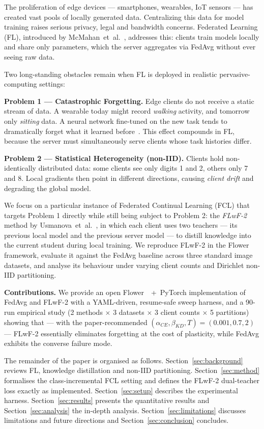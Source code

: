 \documentclass[journal]{IEEEtran}
\begin{document}
The proliferation of edge devices --- smartphones, wearables, IoT
sensors --- has created vast pools of locally generated data.
Centralizing this data for model training raises serious privacy,
legal and bandwidth concerns. Federated Learning (FL), introduced by
McMahan~et~al.~\cite{fedavg}, addresses this: clients train models
locally and share only parameters, which the server aggregates via
FedAvg without ever seeing raw data.

Two long-standing obstacles remain when FL is deployed in realistic
pervasive-computing settings:

\textbf{Problem 1 --- Catastrophic Forgetting.} Edge clients do not
receive a static stream of data. A wearable today might record
\textit{walking} activity, and tomorrow only \textit{sitting} data.
A neural network fine-tuned on the new task tends to dramatically
forget what it learned before~\cite{forgetting}. This effect compounds
in FL, because the server must simultaneously serve clients whose task
histories differ.

\textbf{Problem 2 --- Statistical Heterogeneity (non-IID).} Clients
hold non-identically distributed data: some clients see only digits
1 and 2, others only 7 and 8. Local gradients then point in different
directions, causing \textit{client drift} and degrading the global
model.

We focus on a particular instance of Federated Continual Learning
(FCL) that targets Problem 1 directly while still being subject to
Problem 2: the \emph{FLwF-2} method by Usmanova~et~al.~\cite{flwf},
in which each client uses two teachers --- its previous local model
and the previous server model --- to distill knowledge into the
current student during local training. We reproduce FLwF-2 in the
Flower framework, evaluate it against the FedAvg baseline across three
standard image datasets, and analyse its behaviour under varying
client counts and Dirichlet non-IID partitioning.

\textbf{Contributions.}
We provide an open Flower~\cite{flower}~+~PyTorch implementation of
FedAvg and FLwF-2 with a YAML-driven, resume-safe sweep harness, and
a 90-run empirical study (2 methods $\times$ 3 datasets $\times$ 3
client counts $\times$ 5 partitions) showing that --- with the
paper-recommended $(\alpha_{CE},\beta_{KD},T)=(0.001,0.7,2)$ ---
FLwF-2 essentially eliminates forgetting at the cost of plasticity,
while FedAvg exhibits the converse failure mode.

The remainder of the paper is organised as follows.
Section~\ref{sec:background} reviews FL, knowledge distillation and
non-IID partitioning. Section~\ref{sec:method} formalises the
class-incremental FCL setting and defines the FLwF-2 dual-teacher
loss exactly as implemented. Section~\ref{sec:setup} describes the
experimental harness. Section~\ref{sec:results} presents the
quantitative results and Section~\ref{sec:analysis} the in-depth
analysis. Section~\ref{sec:limitations} discusses limitations and
future directions and Section~\ref{sec:conclusion} concludes.
\end{document}
